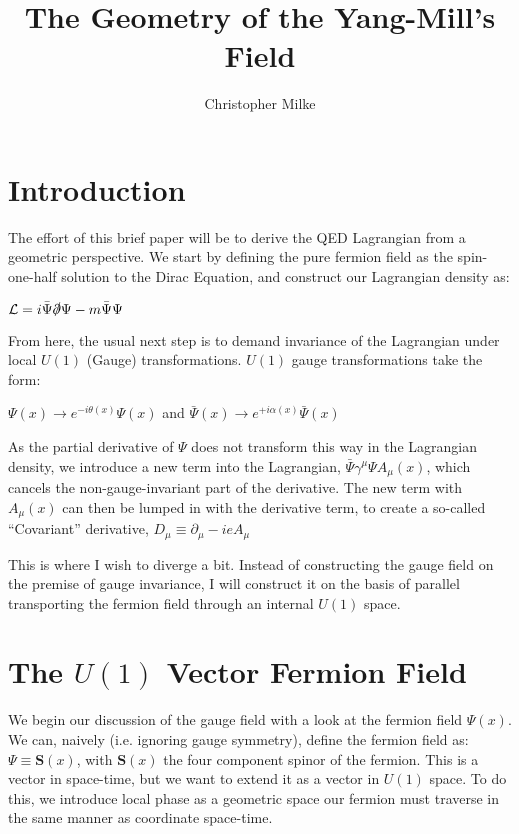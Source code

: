 \documentclass{article}
\begin{document}
\title{The Geometry of the Yang-Mill's Field}
\author{Christopher Milke}

\maketitle

\section{Introduction}
        The effort of this brief paper will be to derive the QED Lagrangian from a geometric perspective. We start by defining the pure fermion field as the spin-one-half solution to the Dirac Equation, and construct our Lagrangian density as:

        $ \mathcal{L} =  i \bar{\Psi} \slashed\partial \Psi - m \bar{\Psi} \Psi   $

        From here, the usual next step is to demand invariance of the Lagrangian under local $U(1)$ (Gauge) transformations. $U(1)$ gauge transformations take the form: 

        $ \Psi(x) \rightarrow e^{-i \theta(x)} \Psi(x) $ and $ \bar\Psi(x) \rightarrow e^{+i \alpha(x)} \bar\Psi(x) $

        As the partial derivative of $\Psi$ does not transform this way in the Lagrangian density, we introduce a new term into the Lagrangian, 
        $  \bar{\Psi} \gamma^\mu \Psi A_\mu(x) $, which cancels the non-gauge-invariant part of the derivative. The new term with $A_\mu(x)$ can then be lumped in with the derivative term, to create a so-called ``Covariant'' derivative,
        $ D_\mu \equiv \partial_\mu - i e A_\mu $

        This is where I wish to diverge a bit. Instead of constructing the gauge field on the premise of gauge invariance, I will construct it on the basis of parallel transporting the fermion field through an internal $U(1)$ space.


\section{The $U(1)$ Vector Fermion Field}
        We begin our discussion of the gauge field with a look at the fermion field $\Psi(x)$. We can, naively (i.e. ignoring gauge symmetry), define the fermion field as: 
        $\Psi \equiv \mathbf{S}(x)$, with $\mathbf{S}(x)$ the four component spinor of the fermion. This is a vector in space-time, but we want to extend it as a vector in $U(1)$ space. To do this, we introduce local phase as a geometric space our fermion must traverse in the same manner as coordinate space-time.
        
\end{document}
